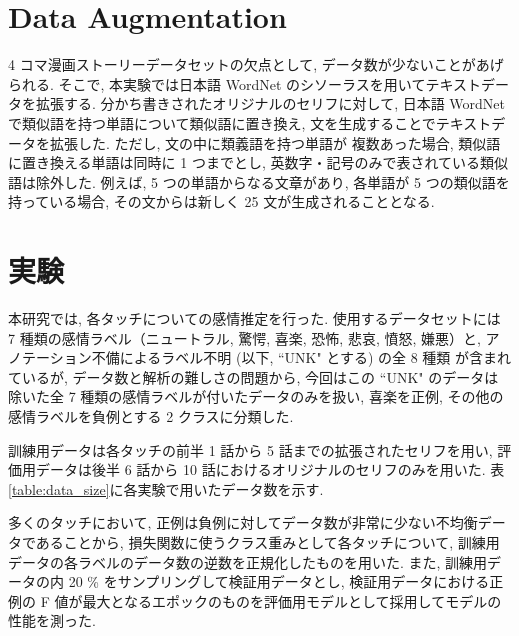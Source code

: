 \documentclass[twocolumn]{jarticle}     %
\begin{document}
\section{Data Augmentation}
4 コマ漫画ストーリーデータセットの欠点として, データ数が少ないことがあげられる. そこで, 本実験では日本語 WordNet \cite{word_net_jp} のシソーラスを用いてテキストデータを拡張する.
分かち書きされたオリジナルのセリフに対して, 日本語 WordNet で類似語を持つ単語について類似語に置き換え, 文を生成することでテキストデータを拡張した. ただし, 文の中に類義語を持つ単語が
複数あった場合, 類似語に置き換える単語は同時に 1 つまでとし, 英数字・記号のみで表されている類似語は除外した. 例えば, 5 つの単語からなる文章があり,
各単語が 5 つの類似語を持っている場合, その文からは新しく 25 文が生成されることとなる.

\section{実験}
本研究では, 各タッチについての感情推定を行った.
使用するデータセットには 7 種類の感情ラベル（ニュートラル, 驚愕, 喜楽, 恐怖, 悲哀, 憤怒, 嫌悪）と, アノテーション不備によるラベル不明 (以下, ``UNK" とする) の全 8 種類
が含まれているが, データ数と解析の難しさの問題から, 今回はこの ``UNK" のデータは除いた全 7 種類の感情ラベルが付いたデータのみを扱い, 喜楽を正例, その他の感情ラベルを負例とする 2 クラスに分類した.

訓練用データは各タッチの前半 1 話から 5 話までの拡張されたセリフを用い,
評価用データは後半 6 話から 10 話におけるオリジナルのセリフのみを用いた.
表\ref{table:data_size}に各実験で用いたデータ数を示す.

多くのタッチにおいて, 正例は負例に対してデータ数が非常に少ない不均衡データであることから, 損失関数に使うクラス重みとして各タッチについて, 訓練用データの各ラベルのデータ数の逆数を正規化したものを用いた. また, 訓練用データの内 20 \% をサンプリングして検証用データとし, 検証用データにおける正例の F 値が最大となるエポックのものを評価用モデルとして採用してモデルの性能を測った.
\end{document}
